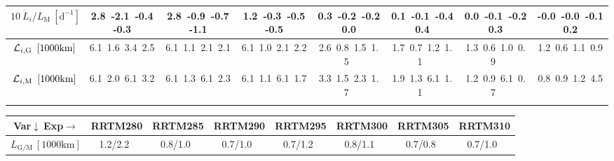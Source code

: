 \begin{table}[H]
{\begin{centering}
\begin{tabular}{|c|c|c|c|c|c|c|c|}
\hline
$10\ \dot{L}_{i}/L_{\mathrm{M}}\ \left[\mathrm{d^{-1}}\right]$ & \textcolor{C1}{2.8}\ \textcolor{C2}{-2.1}\ \textcolor{C3}{-0.4}\ \textcolor{C4}{-0.3}\  & \textcolor{C1}{2.8}\ \textcolor{C2}{-0.9}\ \textcolor{C3}{-0.7}\ \textcolor{C4}{-1.1}\  & \textcolor{C1}{1.2}\ \textcolor{C2}{-0.3}\ \textcolor{C3}{-0.5}\ \textcolor{C4}{-0.5}\  & \textcolor{C1}{0.3}\ \textcolor{C2}{-0.2}\ \textcolor{C3}{-0.2}\ \textcolor{C4}{0.0}\  & \textcolor{C1}{0.1}\ \textcolor{C2}{-0.1}\ \textcolor{C3}{-0.4}\ \textcolor{C4}{0.4}\  & \textcolor{C1}{0.0}\ \textcolor{C2}{-0.1}\ \textcolor{C3}{-0.2}\ \textcolor{C4}{0.3}\  & \textcolor{C1}{-0.0}\ \textcolor{C2}{-0.0}\ \textcolor{C3}{-0.1}\ \textcolor{C4}{0.2}\  \tabularnewline
\hline
${\cal L}_{i,\mathrm{G}}\ \left[1000\mathrm{km}\right]$ & \textcolor{C1}{6.1}\ \textcolor{C2}{1.6}\ \textcolor{C3}{3.4}\ \textcolor{C4}{2.5}\  & \textcolor{C1}{6.1}\ \textcolor{C2}{1.1}\ \textcolor{C3}{2.1}\ \textcolor{C4}{2.1}\  & \textcolor{C1}{6.1}\ \textcolor{C2}{1.0}\ \textcolor{C3}{2.1}\ \textcolor{C4}{2.2}\  & \textcolor{C1}{2.6}\ \textcolor{C2}{0.8}\ \textcolor{C3}{1.5}\ \textcolor{C4}{1.5}\  & \textcolor{C1}{1.7}\ \textcolor{C2}{0.7}\ \textcolor{C3}{1.2}\ \textcolor{C4}{1.1}\  & \textcolor{C1}{1.3}\ \textcolor{C2}{0.6}\ \textcolor{C3}{1.0}\ \textcolor{C4}{0.9}\  & \textcolor{C1}{1.2}\ \textcolor{C2}{0.6}\ \textcolor{C3}{1.1}\ \textcolor{C4}{0.9}\  \tabularnewline
\hline
${\cal L}_{i,\mathrm{M}}\ \left[1000\mathrm{km}\right]$ & \textcolor{C1}{6.1}\ \textcolor{C2}{2.0}\ \textcolor{C3}{6.1}\ \textcolor{C4}{3.2}\  & \textcolor{C1}{6.1}\ \textcolor{C2}{1.3}\ \textcolor{C3}{6.1}\ \textcolor{C4}{2.3}\  & \textcolor{C1}{6.1}\ \textcolor{C2}{1.1}\ \textcolor{C3}{6.1}\ \textcolor{C4}{1.7}\  & \textcolor{C1}{3.3}\ \textcolor{C2}{1.5}\ \textcolor{C3}{2.3}\ \textcolor{C4}{1.7}\  & \textcolor{C1}{1.9}\ \textcolor{C2}{1.3}\ \textcolor{C3}{6.1}\ \textcolor{C4}{1.1}\  & \textcolor{C1}{1.2}\ \textcolor{C2}{0.9}\ \textcolor{C3}{6.1}\ \textcolor{C4}{0.7}\  & \textcolor{C1}{0.8}\ \textcolor{C2}{0.9}\ \textcolor{C3}{1.2}\ \textcolor{C4}{4.5}\  \tabularnewline
\hline
 &  &  &  &  &  &  & \tabularnewline
\hline
\end{tabular}
\begin{tabular}{|c|c|c|c|c|c|c|c|}
\hline
Var$\downarrow\ $Exp$\rightarrow$ & RRTM280 & RRTM285 & RRTM290 & RRTM295 & RRTM300 & RRTM305 & RRTM310 \tabularnewline
\hline
\hline
$L_{\mathrm{G/M}}\ \left[1000\mathrm{km}\right]$ & 1.2/2.2\ & 0.8/1.0\ & 0.7/1.0\ & 0.7/1.2\ & 0.8/1.1\ & 0.7/0.8\ & 0.7/1.0\ \tabularnewline
\hline

\end{tabular}
\end{centering}}
\end{table}
